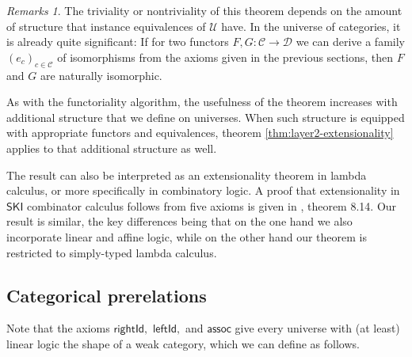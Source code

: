 \documentclass[a4paper]{article}
\theoremstyle{definition}
\theoremstyle{remark}
\newtheorem*{remarks}{Remarks}
\newcommand{\C}{\mathcal{C}}
\newcommand{\D}{\mathcal{D}}
\newcommand{\U}{\mathcal{U}}
\newcommand{\nm}{\mathsf}
\newcommand{\rightId}{\nm{rightId}}
\newcommand{\leftId}{\nm{leftId}}
\newcommand{\compAssoc}{\nm{assoc}}
\begin{document}
\begin{remarks}
  The triviality or nontriviality of this theorem depends on the amount of structure
  that instance equivalences of $\U$ have. In the universe of categories, it is
  already quite significant: If for two functors $F,G : \C \to \D$ we can derive a
  family $(e_c)_{c \in \C}$ of isomorphisms from the axioms given in the previous
  sections, then $F$ and $G$ are naturally isomorphic.

  As with the functoriality algorithm, the usefulness of the theorem increases with
  additional structure that we define on universes. When such structure is equipped
  with appropriate functors and equivalences, theorem \ref{thm:layer2-extensionality}
  applies to that additional structure as well.

  The result can also be interpreted as an extensionality theorem in lambda calculus,
  or more specifically in combinatory logic. A proof that extensionality in $\nm{SKI}$
  combinator calculus follows from five axioms is given in \cite{hindley-seldin},
  theorem 8.14. Our result is similar, the key differences being that on the one hand we also
  incorporate linear and affine logic, while on the other hand our theorem is restricted to
  simply-typed lambda calculus.
\end{remarks}


\subsection{Categorical prerelations}

Note that the axioms $\rightId,$ $\leftId,$ and $\compAssoc$ give every universe with (at least)
linear logic the shape of a weak category, which we can define as follows.
\end{document}
